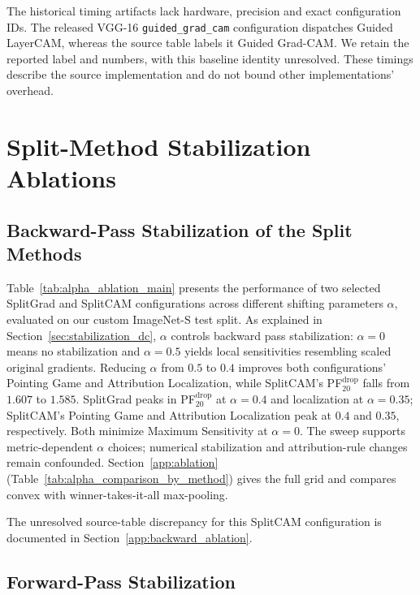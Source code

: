The historical timing artifacts lack hardware, precision and exact configuration IDs. The released VGG-16 \texttt{guided\_grad\_cam} configuration dispatches Guided LayerCAM, whereas the source table labels it Guided Grad-CAM. We retain the reported label and numbers, with this baseline identity unresolved. These timings describe the source implementation and do not bound other implementations' overhead.



\FloatBarrier


\section{Split-Method Stabilization Ablations}\label{sec:ablations}
\subsection{Backward-Pass Stabilization of the Split Methods}\label{subsec:alpha_ablation}

Table~\ref{tab:alpha_ablation_main} presents the performance of two selected SplitGrad and SplitCAM configurations across different shifting parameters $\alpha$, evaluated on our custom ImageNet-S test split. As explained in Section~\ref{sec:stabilization_dc}, $\alpha$ controls backward pass stabilization: $\alpha = 0$ means no stabilization and $\alpha = 0.5$ yields local sensitivities resembling scaled original gradients. Reducing $\alpha$ from $0.5$ to $0.4$ improves both configurations' Pointing Game and Attribution Localization, while SplitCAM's PF$^{\mathrm{drop}}_{20}$ falls from $1.607$ to $1.585$. SplitGrad peaks in PF$^{\mathrm{drop}}_{20}$ at $\alpha = 0.4$ and localization at $\alpha = 0.35$; SplitCAM's Pointing Game and Attribution Localization peak at $0.4$ and $0.35$, respectively. Both minimize Maximum Sensitivity at $\alpha = 0$. The sweep supports metric-dependent $\alpha$ choices; numerical stabilization and attribution-rule changes remain confounded. Section~\ref{app:ablation} (Table~\ref{tab:alpha_comparison_by_method}) gives the full grid and compares convex with winner-takes-it-all max-pooling.

The unresolved source-table discrepancy for this SplitCAM configuration is documented in Section~\ref{app:backward_ablation}.

\subsection{Forward-Pass Stabilization}\label{app:forward_ablation}

